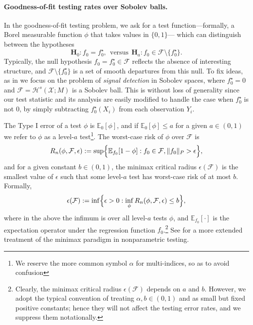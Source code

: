 \documentclass{article}
\newcommand{\1}{\mathbf{1}}
\newcommand{\mc}[1]{\mathcal{#1}}
\newcommand{\Ebb}{\mathbb{E}}
\theoremstyle{alden}
\theoremstyle{aldenthm}
\theoremstyle{definition}
\theoremstyle{remark}
\begin{document}
\paragraph{Goodness-of-fit testing rates over Sobolev balls.}
In the goodness-of-fit testing problem, we ask for a test function---formally, a Borel measurable function $\phi$ that takes values in $\{0,1\}$--- which can distinguish between the hypotheses
\begin{equation}
\mathbf{H}_0: f_0 = f_0^{\star}, ~~\textrm{versus}~~ \mathbf{H}_a: f_0 \in \mc{F} \setminus \{f_0^{\star}\}.
\end{equation} 
Typically, the null hypothesis $f_0 = f_0^{\star} \in \mc{F}$ reflects the absence of interesting structure, and $\mc{F} \setminus  \{f_0^{\star}\}$ is a set of smooth departures from this null. To fix ideas, as in \citet{ingster2009} we focus on the problem of \emph{signal detection} in Sobolev spaces, where $f_0^{\star} = 0$ and $\mc{F} = \mc{H}^s(\mc{X};M)$ is a Sobolev ball. This is without loss of generality since our test statistic and its analysis are easily modified to handle the case when $f_0^{\star}$ is not $0$, by simply subtracting $f_0^{\star}(X_i)$ from each observation $Y_i$.

The Type I error of a test $\phi$ is $\mathbb{E}_0[\phi]$, and if $\mathbb{E}_0[\phi] \leq a$ for a given $a \in (0,1)$ we refer to $\phi$ as a level-$a$ test\footnote{We reserve the more common symbol $\alpha$ for multi-indices, so as to avoid confusion}. The worst-case risk of $\phi$ over $\mc{F}$ is
\begin{equation*}
R_n(\phi, \mc{F}, \epsilon) := \sup\Bigl\{\mathbb{E}_{f_0}[1 - \phi]: f_0 \in \mc{F}, \|f_0\|_{P} > \epsilon\Bigr\},
\end{equation*}
and for a given constant $b \in (0,1)$, the minimax critical radius $\epsilon(\mc{F})$ is the smallest value of $\epsilon$ such that some level-$a$ test has worst-case risk of at most $b$. Formally,
\begin{equation*}
\epsilon(\mc{F}) := \inf\Bigl\{\epsilon > 0: \inf_{\phi} R_n(\phi,\mc{F},\epsilon) \leq b \Bigr\},
\end{equation*} 
where in the above the infimum is over all level-$a$ tests $\phi$, and $\Ebb_{f_0}[\cdot]$ is the expectation operator under the regression function $f_0$.\footnote{Clearly, the minimax critical radius $\epsilon(\mc{F})$ depends on $a$ and $b$. However, we adopt the typical convention of treating $\alpha,b \in (0,1)$ and  as small but fixed positive constants; hence they will not affect the testing error rates, and we suppress them notationally.} See \citet{ingster82,ingster87,ingster2012} for a more extended treatment of the minimax paradigm in nonparametric testing. 
\end{document}
